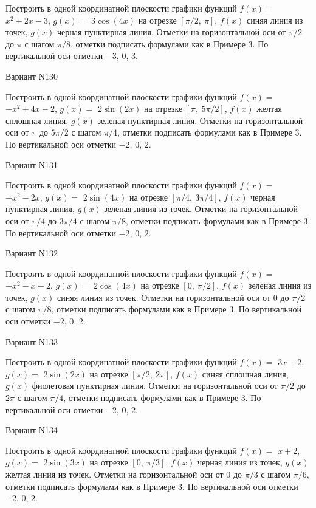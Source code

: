 \documentclass[11pt]{report}
\begin{document}
Построить в одной координатной плоскости графики функций $f(x) = $
    $x^{2} + 2 x - 3$, $g(x) = $
    $3 \cos{\left(4 x \right)}$ на 
    отрезке $\left[ \pi / 2, \  \pi\right]$, $f(x)$ синяя 
    линия из точек, $g(x)$ черная пунктирная линия. 
    Отметки на горизонтальной оси от $\pi / 2$ до $\pi$ с 
    шагом $\pi / 8$, отметки подписать формулами как в Примере 3.  
    По вертикальной оси отметки $-3$, 0, $3$.

Вариант N130

Построить в одной координатной плоскости графики функций $f(x) = $
    $- x^{2} + 4 x - 2$, $g(x) = $
    $2 \sin{\left(2 x \right)}$ на 
    отрезке $\left[ \pi, \  5 \pi / 2\right]$, $f(x)$ желтая 
    сплошная линия, $g(x)$ зеленая пунктирная линия. 
    Отметки на горизонтальной оси от $\pi$ до $5 \pi / 2$ с 
    шагом $\pi / 4$, отметки подписать формулами как в Примере 3.  
    По вертикальной оси отметки $-2$, 0, $2$.

Вариант N131

Построить в одной координатной плоскости графики функций $f(x) = $
    $- x^{2} - 2 x$, $g(x) = $
    $2 \sin{\left(4 x \right)}$ на 
    отрезке $\left[ \pi / 4, \  3 \pi / 4\right]$, $f(x)$ черная 
    пунктирная линия, $g(x)$ зеленая линия из точек. 
    Отметки на горизонтальной оси от $\pi / 4$ до $3 \pi / 4$ с 
    шагом $\pi / 8$, отметки подписать формулами как в Примере 3.  
    По вертикальной оси отметки $-2$, 0, $2$.

Вариант N132

Построить в одной координатной плоскости графики функций $f(x) = $
    $- x^{2} - x - 2$, $g(x) = $
    $2 \cos{\left(4 x \right)}$ на 
    отрезке $\left[ 0, \  \pi / 2\right]$, $f(x)$ зеленая 
    линия из точек, $g(x)$ синяя линия из точек. 
    Отметки на горизонтальной оси от $0$ до $\pi / 2$ с 
    шагом $\pi / 8$, отметки подписать формулами как в Примере 3.  
    По вертикальной оси отметки $-2$, 0, $2$.

Вариант N133

Построить в одной координатной плоскости графики функций $f(x) = $
    $3 x + 2$, $g(x) = $
    $2 \sin{\left(2 x \right)}$ на 
    отрезке $\left[ \pi / 2, \  2 \pi\right]$, $f(x)$ синяя 
    сплошная линия, $g(x)$ фиолетовая пунктирная линия. 
    Отметки на горизонтальной оси от $\pi / 2$ до $2 \pi$ с 
    шагом $\pi / 4$, отметки подписать формулами как в Примере 3.  
    По вертикальной оси отметки $-2$, 0, $2$.

Вариант N134

Построить в одной координатной плоскости графики функций $f(x) = $
    $x + 2$, $g(x) = $
    $2 \sin{\left(3 x \right)}$ на 
    отрезке $\left[ 0, \  \pi / 3\right]$, $f(x)$ черная 
    линия из точек, $g(x)$ желтая линия из точек. 
    Отметки на горизонтальной оси от $0$ до $\pi / 3$ с 
    шагом $\pi / 6$, отметки подписать формулами как в Примере 3.  
    По вертикальной оси отметки $-2$, 0, $2$.
\end{document}
